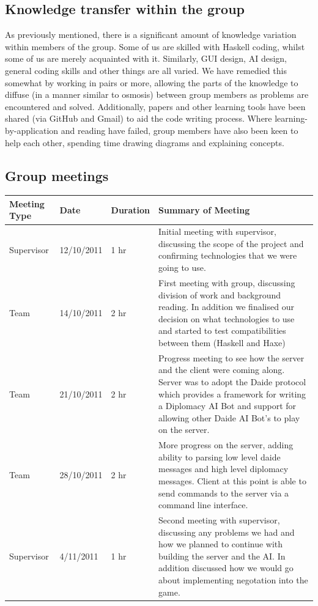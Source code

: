 \documentclass[11pt]{article}
\begin{document}
\subsection{Knowledge transfer within the group}
As previously mentioned, there is a significant amount of knowledge variation
within members of the group. Some of us are skilled with Haskell coding, whilst
some of us are merely acquainted with it. Similarly, GUI design, AI design,
general coding skills and other things are all varied. We have remedied this 
somewhat by working in pairs or more, allowing the parts of the knowledge to 
diffuse (in a manner similar to osmosis) between group members as problems are
encountered and solved. Additionally, papers and other learning tools have been
shared (via GitHub and Gmail) to aid the code writing process. Where 
learning-by-application and reading have failed, group members have also been
keen to help each other, spending time drawing diagrams and explaining concepts.

\subsection{Group meetings}
\begin{center}
    \begin{tabular}{ | l | l | l | p{8cm} |}
    \hline
    Meeting Type       & Date          & Duration   & Summary of Meeting \\ \hline

    Supervisor         & 12/10/2011    & 1 hr       & Initial meeting with supervisor, discussing the scope of the project and confirming technologies that we were going to use. \\ \hline
    Team               & 14/10/2011    & 2 hr       & First meeting with group, discussing division of work and background reading. In addition we finalised our decision on what technologies to use and started to test compatibilities between them (Haskell and Haxe) \\ \hline
    Team               & 21/10/2011    & 2 hr       & Progress meeting to see how the server and the client were coming along. Server was to adopt the Daide protocol which provides a framework for writing a Diplomacy AI Bot and support for allowing other Daide AI Bot's to play on the server.  \\ \hline
    Team               & 28/10/2011    & 2 hr       & More progress on the server, adding ability to parsing low level daide messages and high level diplomacy messages. Client at this point is able to send commands to the server via a command line interface.  \\ \hline
    Supervisor               & 4/11/2011     & 1 hr       & Second meeting with supervisor, discussing any problems we had and how we planned to continue with building the server and the AI. In addition discussed how we would go about implementing negotation into the game.  \\ \hline

    \end{tabular}
\end{center}
\end{document}
